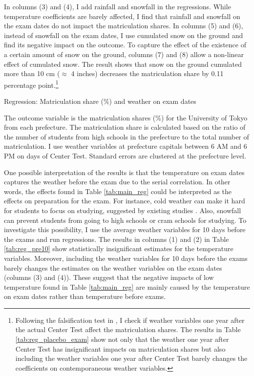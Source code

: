 \documentclass[12pt,letterpaper]{article}
\begin{document}
In columns (3) and (4), I add rainfall and snowfall in the regressions.
While temperature coefficients are barely affected, I find that rainfall and snowfall on the exam dates do not impact the matriculation shares.
In columns (5) and (6), instead of snowfall on the exam dates, I use cumulated snow on the ground and find its negative impact on the outcome. 
To capture the effect of the existence of a certain amount of snow on the ground, columns (7) and (8) allow a non-linear effect of cumulated snow.
The result shows that snow on the ground cumulated more than 10 cm ($\approx$ 4 inches) decreases the matriculation share by 0.11 percentage point.\footnote{
  Following the falsification test in \citet{Cho2017}, I check if weather variables one year after the actual Center Test affect the matriculation shares.
  The results in Table \ref{tab:reg_placebo_exam} show not only that the weather one year after Center Test has insignificant impacts on matriculation shares but also including the weather variables one year after Center Test barely changes the coefficients on contemporaneous weather variables.
}

\begin{table}[H]
  \center
  \caption{Regression: Matriculation share (\%) and weather on exam dates}
  \footnotesize
  
  \label{tab:main_reg}
  \small
  \begin{tablenotes}
    \item
      The outcome variable is the matriculation shares (\%) for the University of Tokyo from each prefecture.
      The matriculation share is calculated based on the ratio of the number of students from high schools in the prefecture to the total number of matriculation.
      I use weather variables at prefecture capitals between 6 AM and 6 PM on days of Center Test.
      Standard errors are clustered at the prefecture level.
  \end{tablenotes}
\end{table}

One possible interpretation of the results is that the temperature on exam dates captures the weather before the exam due to the serial correlation.
In other words, the effects found in Table \ref{tab:main_reg} could be interpreted as the effects on preparation for the exam. 
For instance, cold weather can make it hard for students to focus on studying, suggested by existing studies \citep{Taylor2016}.
Also, snowfall can prevent students from going to high schools or cram schools for studying.
To investigate this possibility, I use the average weather variables for 10 days before the exams and run regressions.
The results in columns (1) and (2) in Table \ref{tab:reg_pre10} show statistically insignificant estimates for the temperature variables.
Moreover, including the weather variables for 10 days before the exams barely changes the estimates on the weather variables on the exam dates (columns (3) and (4)).
These suggest that the negative impacts of low temperature found in Table \ref{tab:main_reg} are mainly caused by the temperature on exam dates rather than temperature before exams.
\end{document}
